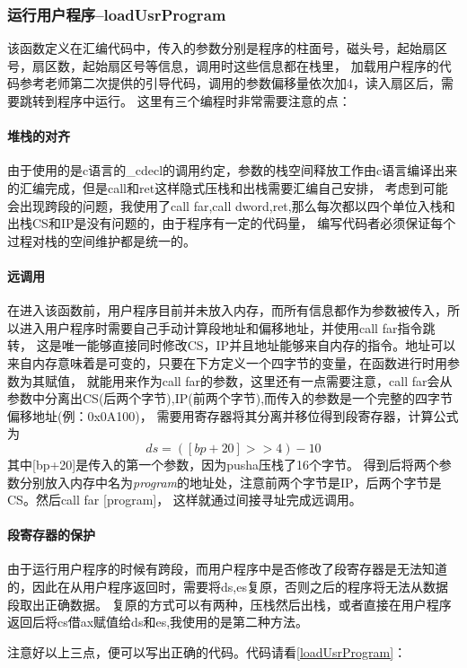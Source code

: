 \documentclass[a4paper, 11pt]{article} %
\begin{document}
\subsubsection{运行用户程序--loadUsrProgram}
该函数定义在汇编代码中，传入的参数分别是程序的柱面号，磁头号，起始扇区号，扇区数，起始扇区号等信息，调用时这些信息都在栈里，
加载用户程序的代码参考老师第二次提供的引导代码，调用的参数偏移量依次加4，读入扇区后，需要跳转到程序中运行。
这里有三个编程时非常需要注意的点：
\paragraph{堆栈的对齐}
由于使用的是c语言的\_cdecl的调用约定，参数的栈空间释放工作由c语言编译出来的汇编完成，但是call和ret这样隐式压栈和出栈需要汇编自己安排，
考虑到可能会出现跨段的问题，我使用了call far,call dword,ret,那么每次都以四个单位入栈和出栈CS和IP是没有问题的，由于程序有一定的代码量，
编写代码者必须保证每个过程对栈的空间维护都是统一的。
\paragraph{远调用}
在进入该函数前，用户程序目前并未放入内存，而所有信息都作为参数被传入，所以进入用户程序时需要自己手动计算段地址和偏移地址，并使用call far指令跳转，
这是唯一能够直接同时修改CS，IP并且地址能够来自内存的指令。地址可以来自内存意味着是可变的，只要在下方定义一个四字节的变量，在函数进行时用参数为其赋值，
就能用来作为call far的参数，这里还有一点需要注意，call far会从参数中分离出CS(后两个字节),IP(前两个字节),而传入的参数是一个完整的四字节偏移地址(例：0x0A100)，
需要用寄存器将其分离并移位得到段寄存器，计算公式为
\begin{equation}
  ds=([bp+20]>>4)-10
\end{equation}
其中[bp+20]是传入的第一个参数，因为pusha压栈了16个字节。
得到后将两个参数分别放入内存中名为\textit{program}的地址处，注意前两个字节是IP，后两个字节是CS。然后call far [program]，
这样就通过间接寻址完成远调用。

\paragraph{段寄存器的保护}
由于运行用户程序的时候有跨段，而用户程序中是否修改了段寄存器是无法知道的，因此在从用户程序返回时，需要将ds,es复原，否则之后的程序将无法从数据段取出正确数据。
复原的方式可以有两种，压栈然后出栈，或者直接在用户程序返回后将cs借ax赋值给ds和es,我使用的是第二种方法。

注意好以上三点，便可以写出正确的代码。代码请看\ref{loadUsrProgram}：
\end{document}
